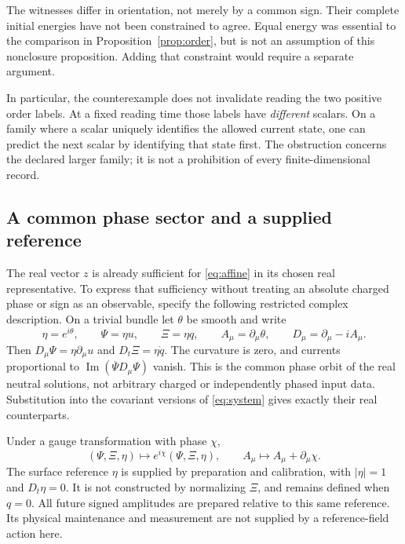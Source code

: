 \documentclass[11pt,a4paper]{article}
\theoremstyle{remark}
\begin{document}
The witnesses differ in orientation, not merely by a common sign.
Their complete initial energies have not been constrained to agree.
Equal energy was essential to the comparison in
Proposition~\ref{prop:order}, but is not an assumption of this
nonclosure proposition. Adding that constraint would require a separate
argument.

In particular, the counterexample does not invalidate reading the two
positive order labels. At a fixed reading time those labels have
\emph{different} scalars. On a family where a scalar uniquely identifies
the allowed current state, one can predict the next scalar by identifying
that state first. The obstruction concerns the declared larger family;
it is not a prohibition of every finite-dimensional record.

\subsection{A common phase sector and a supplied reference}
\label{sec:reference}

The real vector $z$ is already sufficient for \eqref{eq:affine} in its
chosen real representative. To express that sufficiency without treating
an absolute charged phase or sign as an observable, specify the following
restricted complex description. On a trivial bundle let $\theta$ be
smooth and write
\begin{equation}
 \eta=e^{i\theta},\qquad \Psi=\eta u,\qquad \Xi=\eta q,
 \qquad A_\mu=\partial_\mu\theta,\qquad D_\mu=\partial_\mu-iA_\mu.
 \label{eq:common-phase}
\end{equation}
Then $D_\mu\Psi=\eta\partial_\mu u$ and $D_t\Xi=\eta\dot q$.
The curvature is zero, and currents proportional to
$\operatorname{Im}(\overline\Psi D_\mu\Psi)$ vanish. This is the common
phase orbit of the real neutral solutions, not arbitrary charged or
independently phased input data. Substitution into the covariant versions
of \eqref{eq:system} gives exactly their real counterparts.

Under a gauge transformation with phase $\chi$,
\[
 (\Psi,\Xi,\eta)\mapsto e^{i\chi}(\Psi,\Xi,\eta),\qquad
 A_\mu\mapsto A_\mu+\partial_\mu\chi.
\]
The surface reference $\eta$ is supplied by preparation and calibration,
with $|\eta|=1$ and $D_t\eta=0$. It is not constructed by normalizing
$\Xi$, and remains defined when $q=0$. All future signed amplitudes are
prepared relative to this same reference. Its physical maintenance and
measurement are not supplied by a reference-field action here.
\end{document}
